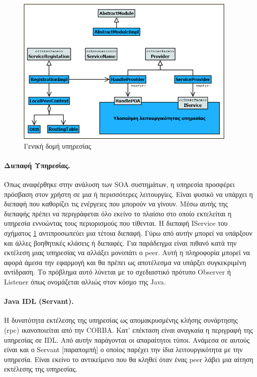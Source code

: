 \begin{figure}[htbp]
  \begin{center}
    \includegraphics[width=0.95\textwidth]{Figures/Architecture/General_service_structure.png}
  \end{center}
  \caption{Γενική δομή υπηρεσίας}
  \label{fig:ServiceStructure}
\end{figure}

\paragraph{Διεπαφή Υπηρεσίας.} Όπως αναφέρθηκε στην ανάλυση των 
SOA συστημάτων, η υπηρεσία προσφέρει πρόσβαση στον χρήστη σε μια ή 
περισσότερες λειτουργίες. Είναι φυσικό να υπάρχει η διεπαφή που καθορίζει 
τις ενέργειες που μπορούν να γίνουν. Μέσω αυτής της διεπαφής πρέπει να 
περιγράφεται όλο εκείνο το πλαίσιο στο οποίο εκτελείται η υπηρεσία 
εννοώντας τους περιορισμούς που τίθενται. Η διεπαφή IService του σχήματος 
\ref{fig:ServiceStructure} αντιπροσωπεύει μια τέτοια διεπαφή. Γύρω από αυτήν 
μπορεί να υπάρξουν και άλλες βοηθητικές κλάσεις ή διεπαφές. Για παράδειγμα 
είναι πιθανό κατά την εκτέλεση μιας υπηρεσίας να αλλάξει μονοπάτι ο peer. 
Αυτή η πληροφορία μπορεί να αφορά άμεσα την εφαρμογή και θα πρέπει ως 
αποτέλεσμα να υπάρξει συγκεκριμένη αντίδραση. Το πρόβλημα αυτό λύνεται 
με το σχεδιαστικό πρότυπο Observer \citep{GoF} ή Listener όπως ονομάζεται 
αλλιώς στον κόσμο της Java.

\paragraph{Java IDL (Servant).} Η δυνατότητα εκτέλεσης της υπηρεσίας ως 
απομακρυσμένης κλήσης συνάρτησης (rpc) ικανοποιείται από την CORBA. Κατ' 
επέκταση είναι αναγκαία η περιγραφή της υπηρεσίας σε IDL. Από αυτήν 
παράγονται οι απαραίτητοι τύποι. Ανάμεσα σε αυτούς είναι και ο Servant 
$[$παραπομπή$]$ ο οποίος παρέχει την ίδια λειτουργικότητα με την 
υπηρεσία. Είναι εκείνο το αντικείμενο που θα κληθεί όταν ένας peer λάβει 
μια αίτηση εκτέλεσης της υπηρεσίας.

